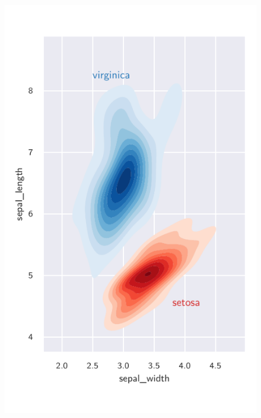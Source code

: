 \documentclass[a4paper]{quantumarticle}
\begin{document}
\begin{figure}
	\centering
	\includegraphics{iris}
	\caption{\lipsum[3]}
\end{figure}

\lipsum[40-50]
    
\end{document}
